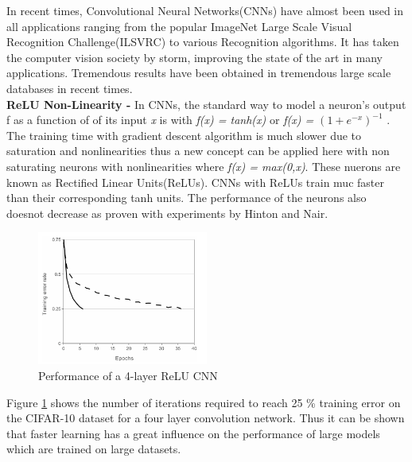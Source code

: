 In recent times, Convolutional Neural Networks(CNNs) have almost been used in all applications ranging from the popular ImageNet Large Scale Visual Recognition Challenge(ILSVRC) to various Recognition algorithms. It has taken the computer vision society by storm, improving the state of the art in many applications. Tremendous results have been obtained in tremendous large scale databases in recent times. \\

\textbf{ReLU Non-Linearity - } In CNNs, the standard way to model a neuron's output f as a function of of its input \textit{x} is with \textit{f(x) = tanh(x)} or \textit{f(x) = $(1+e^{-x})^{-1}$} . The training time with gradient descent algorithm is much slower due to saturation and nonlinearities thus a new concept can be applied here with non saturating neurons with nonlinearities where \textit{f(x) = max(0,x)}. These nuerons are known as Rectified Linear Units(ReLUs). CNNs with ReLUs train muc faster than their corresponding tanh units. The performance of the neurons also doesnot decrease as proven with experiments by Hinton and Nair\cite{nair}. 

\begin{figure}
	\begin{center}
		\includegraphics[width=0.5\textwidth]{Figures/Figure21}
	\end{center}
	\caption{Performance of a 4-layer ReLU CNN\cite{krizhevsky}}
	\label{fig:Figure21}
\end{figure}

Figure \ref{fig:Figure21} \cite{krizhevsky} shows the number of iterations required to reach 25 {\%} training error on the CIFAR-10 dataset for a four layer convolution network. Thus it can be shown that faster learning has a great influence on the performance of large models which are trained on large datasets.

